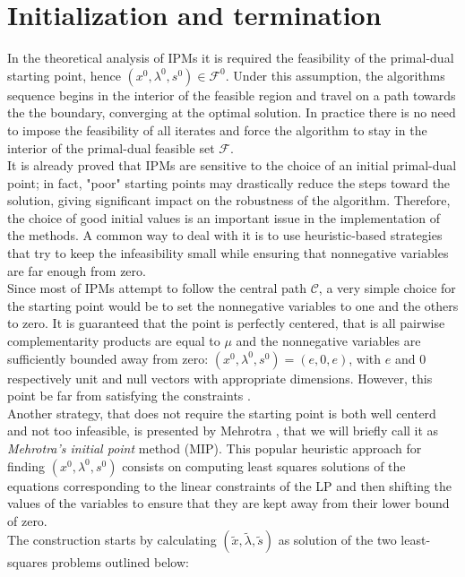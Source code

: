 \documentclass[a4paper,10 pt,titlepage,twoside]{report}
\theoremstyle{plain}
\theoremstyle{definition}
\theoremstyle{remark}
\begin{document}
{{\section*{Initialization and termination}
In the theoretical analysis of IPMs it is required the feasibility of the primal-dual starting point, hence $(x^{0}, \lambda^{0}, s^{0})\in\mathcal{F}^{0}$. Under this assumption, the algorithms sequence begins in the interior of the feasible region and travel on
a path towards the the boundary, converging at the optimal solution. In practice there is no need to impose the feasibility of all iterates and force the algorithm to stay in the interior of the primal-dual feasible set $\mathcal{F}$.\\
It is already proved that IPMs are sensitive to the choice of an initial primal-dual point; in fact, "poor" starting points may drastically reduce the steps toward the solution, giving significant impact on the robustness of the algorithm. Therefore, the choice of good initial values is an important issue in the implementation of the methods. A common way to deal with it is to use heuristic-based strategies that try to keep the infeasibility small while ensuring that nonnegative variables are far enough from zero.\\
Since most of IPMs attempt to follow the central path $\mathcal{C}$, a very simple choice for the starting point would be to set the nonnegative variables to one and the others to zero. It is guaranteed that the point is perfectly centered, that is all pairwise complementarity products are equal to $\mu$ and the nonnegative variables are sufficiently bounded away from zero: $(x^{0},\lambda^{0},s^{0})=(e, 0, e)$, with $e$ and $0$ respectively unit and null vectors with appropriate dimensions. However, this point be far from satisfying the constraints \cite{VAN}.\\
Another strategy, that does not require the starting point is both well centerd and not too infeasible, is presented by Mehrotra \cite{MER}, that we will briefly call it as \textit{Mehrotra's initial point} method (MIP). This popular heuristic approach for finding $(x^{0}, \lambda^{0}, s^{0})$ consists on computing least squares solutions of the equations corresponding to the linear constraints of the LP and then shifting the values of the variables to ensure that they are kept away from their lower bound of zero. \\
The construction starts by calculating $(\tilde{x}, \tilde{\lambda}, \tilde{s})$ as solution of the two least-squares problems outlined below:
}}
\end{document}
